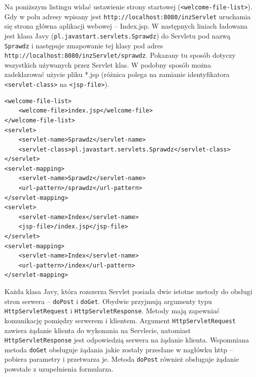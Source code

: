 \documentclass[eng,printmode,oneside]{mgr}
\begin{document}
Na poniższym listingu widać ustawienie strony startowej
(\texttt{<welcome-file-list>}). Gdy w polu adresy wpisany jest
\texttt{http://localhost:8080/inzServlet} uruchamia się strona główna aplikacji
webowej -- Index.jsp. W następnych liniach ładowana jest klasa
Javy (\texttt{pl.javastart.servlets.Sprawdz}) do Servletu pod nazwą
\texttt{Sprawdz} i następuje zmapowanie tej klasy pod adres
\texttt{http://localhost:8080/inzServlet/sprawdz}. Pokazany tu sposób dotyczy
wszystkich używanych przez Servlet klas. W podobny sposób można zadeklarować użycie
pliku *.jsp (różnica polega na zamianie identyfikatora \texttt{<servlet-class>}
na \texttt{<jsp-file>}). 

\lstset{language=XML,firstnumber=1,stepnumber=1}
\begin{lstlisting}[caption=Fragment pliku web.xml,label=lst:web.xml]
<welcome-file-list>
	<welcome-file>index.jsp</welcome-file>
</welcome-file-list>
<servlet>
	<servlet-name>Sprawdz</servlet-name>
	<servlet-class>pl.javastart.servlets.Sprawdz</servlet-class>
</servlet>
<servlet-mapping>
	<servlet-name>Sprawdz</servlet-name>
	<url-pattern>/sprawdz</url-pattern>
</servlet-mapping>
<servlet>
	<servlet-name>Index</servlet-name>
	<jsp-file>/index.jsp</jsp-file>
</servlet>
<servlet-mapping>
	<servlet-name>Index</servlet-name>
	<url-pattern>/index</url-pattern>
</servlet-mapping>
\end{lstlisting}

Każda klasa Javy, która rozszerza Servlet posiada dwie istotne metody do obsługi
stron serwera -- \texttt{doPost} i \texttt{doGet}. Obydwie przyjmują argumenty
typu \texttt{HttpServletRequest} i \texttt{HttpServletResponse}.
Metody mają zapewniać komunikację pomiędzy serwerem i klientem. Argument
\texttt{HttpServletRequest} zawiera żądanie klienta do wykonania na Servlecie,
natomiast \texttt{HttpServletResponse} jest odpowiedzią serwera na żądanie
klienta.
Wspomniana metoda \texttt{doGet} obsługuje żądania jakie zostały przesłane w
nagłówku http -- pobiera parametry i przetwarza je. Metoda \texttt{doPost}
również obsługuje żądanie powstałe z uzupełnienia formularza.
\end{document}
